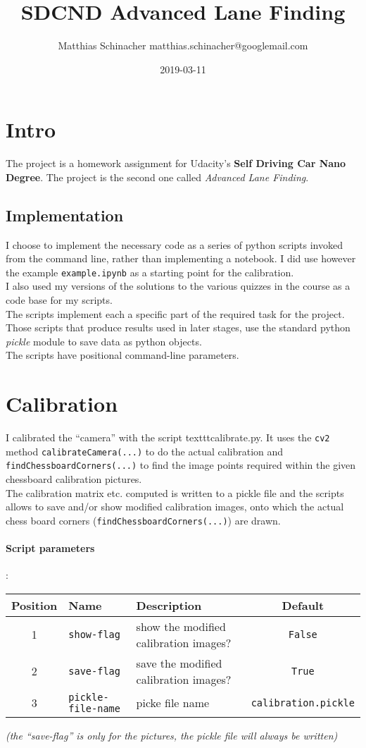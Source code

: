 \documentclass[a4paper]{article}
\title{SDCND Advanced Lane Finding}
\date{2019-03-11}
\author{Matthias Schinacher matthias.schinacher@googlemail.com}
\begin{document}
\maketitle
\tableofcontents
\newpage

\section{Intro}
The project is a homework assignment for Udacity's \textbf{Self Driving Car Nano Degree}.
The project is the second one called \textit{Advanced Lane Finding}.

\subsection{Implementation}
I choose to implement the necessary code as a series of python scripts invoked from
the command line, rather than implementing a notebook. I did use however the
example \texttt{example.ipynb} as a starting point for the calibration.
\\
I also used my versions of the solutions to the various quizzes in the course
as a code base for my scripts.
\\
The scripts implement each a specific part of the required task for the
project. Those scripts that produce results used in later stages, use the
standard python \textit{pickle} module to save data as python objects.
\\
The scripts have positional command-line parameters.

\section{Calibration}
I calibrated the \enquote{camera} with the script texttt{calibrate.py}.
It uses the \texttt{cv2} method \texttt{calibrateCamera(...)} to do the actual
calibration and \texttt{findChessboardCorners(...)} to find the image points
required within the given chessboard calibration pictures.
\\
The calibration matrix etc. computed is written to a pickle file and the
scripts allows to save and/or show modified calibration images, onto which
the actual chess board corners (\texttt{findChessboardCorners(...)})
are drawn.

\paragraph{Script parameters}
:\\
\small
\begin{tabular}{ |c|l|l|c| }
  \hline
Position & Name & Description & Default \\
  \hline
1 & \texttt{show-flag} & show the modified calibration images? & \texttt{False} \\
2 & \texttt{save-flag} & save the modified calibration images? & \texttt{True} \\
3 & \texttt{pickle-file-name} & picke file name & \texttt{calibration.pickle} \\
\hline
\end{tabular}
\normalsize
\textit{(the \enquote{save-flag} is only for the pictures, the pickle file will always be written)}
\end{document}
